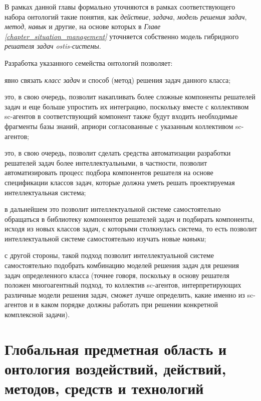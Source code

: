 В рамках данной главы формально уточняются в рамках соответствующего набора онтологий такие понятия, как \textit{действие}, \textit{задача}, \textit{модель решения задач}, \textit{метод}, \textit{навык} и другие, на основе которых в \textit{Главе \ref{chapter_situation_management} } уточняется собственно модель гибридного \textit{решателя задач ostis-системы}.

Разработка указанного семейства онтологий позволяет:
\begin{textitemize}
	\item явно связать \textit{класс задач} и способ (метод) решения задач данного класса;
	\item это, в свою очередь, позволит накапливать более сложные компоненты решателей задач и еще больше упростить их интеграцию, поскольку вместе с коллективом sc-агентов в соответствующий компонент также будут входить необходимые фрагменты базы знаний, априори согласованные с указанным коллективом sc-агентов;
	\item это, в свою очередь, позволит сделать средства автоматизации разработки решателей задач более интеллектуальными, в частности, позволит автоматизировать процесс подбора компонентов решателя на основе спецификации классов задач, которые должна уметь решать проектируемая интеллектуальная система;
	\item в дальнейшем это позволит интеллектуальной системе самостоятельно обращаться в библиотеку компонентов решателей задач и подбирать компоненты, исходя из новых классов задач, с которыми столкнулась система, то есть позволит интеллектуальной системе самостоятельно изучать новые \textit{навыки};
	\item с другой стороны, такой подход позволит интеллектуальной системе самостоятельно подобрать комбинацию моделей решения задач для решения задач определенного класса (точнее говоря, поскольку в основу решателя положен многоагентный подход, то коллектив sc-агентов, интерпретирующих различные модели решения задач, сможет лучше определить, какие именно из sc-агентов и в каком порядке должны работать при решении конкретной комплексной задачи).
\end{textitemize}


\section{Глобальная предметная область и онтология воздействий, действий, методов, средств и технологий}
\label{sec_global_sd_actions}

